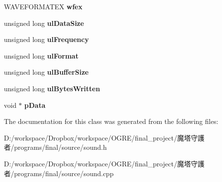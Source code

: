 \begin{DoxyCompactItemize}
\item 
\hypertarget{class_s_o_u_n_d_aa617757733d08fb0c90e2aee02c67ef0}{
WAVEFORMATEX {\bfseries wfex}}
\label{class_s_o_u_n_d_aa617757733d08fb0c90e2aee02c67ef0}

\item 
\hypertarget{class_s_o_u_n_d_abccb3cdff4440d791c9a2e3fbc77b77c}{
unsigned long {\bfseries ulDataSize}}
\label{class_s_o_u_n_d_abccb3cdff4440d791c9a2e3fbc77b77c}

\item 
\hypertarget{class_s_o_u_n_d_aba5b5324724cb90d8aa3f9d31069ba76}{
unsigned long {\bfseries ulFrequency}}
\label{class_s_o_u_n_d_aba5b5324724cb90d8aa3f9d31069ba76}

\item 
\hypertarget{class_s_o_u_n_d_ab9858c7e9e36af3bf8c4d0e76c13718c}{
unsigned long {\bfseries ulFormat}}
\label{class_s_o_u_n_d_ab9858c7e9e36af3bf8c4d0e76c13718c}

\item 
\hypertarget{class_s_o_u_n_d_a49925a922bdd7062fc9916fd86254980}{
unsigned long {\bfseries ulBufferSize}}
\label{class_s_o_u_n_d_a49925a922bdd7062fc9916fd86254980}

\item 
\hypertarget{class_s_o_u_n_d_a3af2648bc0569915511860ebebfcd246}{
unsigned long {\bfseries ulBytesWritten}}
\label{class_s_o_u_n_d_a3af2648bc0569915511860ebebfcd246}

\item 
\hypertarget{class_s_o_u_n_d_a46832ac27ae2ef80a8696d23a3d7acff}{
void $\ast$ {\bfseries pData}}
\label{class_s_o_u_n_d_a46832ac27ae2ef80a8696d23a3d7acff}

\end{DoxyCompactItemize}


The documentation for this class was generated from the following files:\begin{DoxyCompactItemize}
\item 
D:/workspace/Dropbox/workspace/OGRE/final\_\-project/魔塔守護者/programs/final/source/sound.h\item 
D:/workspace/Dropbox/workspace/OGRE/final\_\-project/魔塔守護者/programs/final/source/sound.cpp\end{DoxyCompactItemize}
